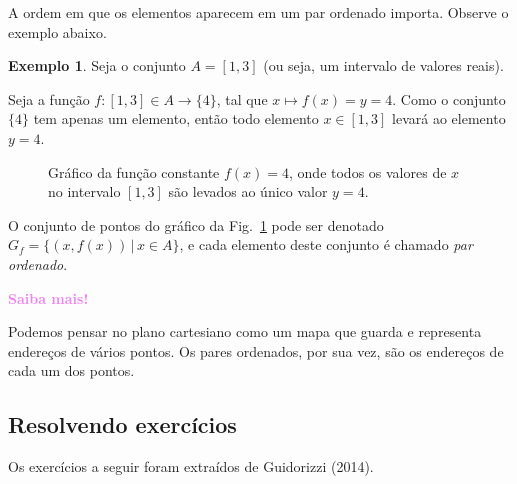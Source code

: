 \documentclass[12pt,openright,twoside,a4paper]{article}
\theoremstyle{definition}
\newtheorem{example}{Exemplo}[section]
\begin{document}
	A ordem em que os elementos aparecem em um par ordenado importa. Observe o exemplo abaixo.
	
	\begin{example}
		Seja o conjunto $A = [1,3]$ (ou seja, um intervalo de valores reais).
		
		Seja a função $f: [1,3] \in A \longrightarrow \{4\}$, tal que $x \mapsto f(x) = y = 4$. Como o conjunto $\{4\}$ tem apenas um elemento, então todo elemento $x \in [1,3]$ levará ao elemento $y=4$.
		
		\begin{figure}[h]
			\centering
			\caption{Gráfico da função constante $f(x) = 4$, onde todos os valores de $x$ no intervalo $[1,3]$ são levados ao único valor $y = 4$.}
			\label{fig:funcao_constante_no_plano}
		\end{figure}
		
		O conjunto de pontos do gráfico da Fig.~\ref{fig:funcao_constante_no_plano} pode ser denotado $G_f = \{ (x, f(x)) \,|\, x \in A\}$, e cada elemento deste conjunto é chamado \textit{par ordenado}.
	\end{example}
	
	\begin{snugshade}
		\textbf{\textcolor{violet}{Saiba mais!}}
		
		Podemos pensar no plano cartesiano como um mapa que guarda e representa endereços de vários pontos. Os pares ordenados, por sua vez, são os endereços de cada um dos pontos.
	\end{snugshade}
	
	
	\subsection{Resolvendo exercícios}
	Os exercícios a seguir foram extraídos de Guidorizzi (2014).
	
\end{document}
